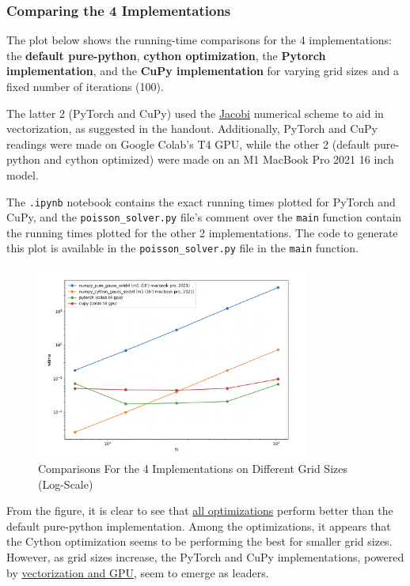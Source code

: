 \documentclass[a4paper,12pt]{article}
\begin{document}
\subsubsection{Comparing the 4 Implementations}
The plot below shows the running-time comparisons for the 4 implementations: the \textbf{default pure-python}, \textbf{cython optimization}, the \textbf{Pytorch implementation}, and the \textbf{CuPy implementation} for varying grid sizes and a fixed number of iterations (100). 

The latter 2 (PyTorch and CuPy) used the \underline{Jacobi} numerical scheme to aid in vectorization, as suggested in the handout. Additionally, PyTorch and CuPy readings were made on Google Colab's T4 GPU, while the other 2 (default pure-python and cython optimized) were made on an M1 MacBook Pro 2021 16 inch model. 

The \verb|.ipynb| notebook contains the exact running times plotted for PyTorch and CuPy, and the \verb|poisson_solver.py| file's comment over the \verb|main| function contain the running times plotted for the other 2 implementations. The code to generate this plot is available in the \verb|poisson_solver.py| file in the \verb|main| function.

\begin{figure}[H]
  \centering
  \includegraphics[width=0.8\textwidth]{images/ex1_all4_comparison.png}
  \caption{Comparisons For the 4 Implementations on Different Grid Sizes (Log-Scale)}
\end{figure}

From the figure, it is clear to see that \underline{all optimizations} perform better than the default pure-python implementation. Among the optimizations, it appears that the Cython optimization seems to be performing the best for smaller grid sizes. However, as grid sizes increase, the PyTorch and CuPy implementations, powered by \underline{vectorization and GPU}, seem to emerge as leaders. 
\end{document}
